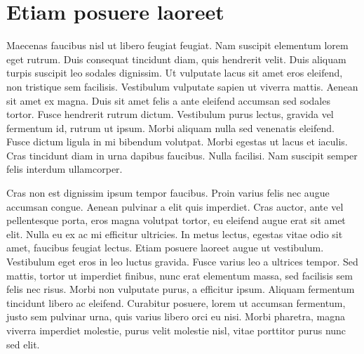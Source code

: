 \chapter{Etiam posuere laoreet}\label{app:two}
Maecenas faucibus nisl ut libero feugiat feugiat. Nam suscipit elementum lorem eget rutrum. Duis consequat tincidunt diam, quis hendrerit velit. Duis aliquam turpis suscipit leo sodales dignissim. Ut vulputate lacus sit amet eros eleifend, non tristique sem facilisis. Vestibulum vulputate sapien ut viverra mattis. Aenean sit amet ex magna. Duis sit amet felis a ante eleifend accumsan sed sodales tortor. Fusce hendrerit rutrum dictum. Vestibulum purus lectus, gravida vel fermentum id, rutrum ut ipsum. Morbi aliquam nulla sed venenatis eleifend. Fusce dictum ligula in mi bibendum volutpat. Morbi egestas ut lacus et iaculis. Cras tincidunt diam in urna dapibus faucibus. Nulla facilisi. Nam suscipit semper felis interdum ullamcorper.\par

Cras non est dignissim ipsum tempor faucibus. Proin varius felis nec augue accumsan congue. Aenean pulvinar a elit quis imperdiet. Cras auctor, ante vel pellentesque porta, eros magna volutpat tortor, eu eleifend augue erat sit amet elit. Nulla eu ex ac mi efficitur ultricies. In metus lectus, egestas vitae odio sit amet, faucibus feugiat lectus. Etiam posuere laoreet augue ut vestibulum. Vestibulum eget eros in leo luctus gravida. Fusce varius leo a ultrices tempor. Sed mattis, tortor ut imperdiet finibus, nunc erat elementum massa, sed facilisis sem felis nec risus. Morbi non vulputate purus, a efficitur ipsum. Aliquam fermentum tincidunt libero ac eleifend. Curabitur posuere, lorem ut accumsan fermentum, justo sem pulvinar urna, quis varius libero orci eu nisi. Morbi pharetra, magna viverra imperdiet molestie, purus velit molestie nisl, vitae porttitor purus nunc sed elit. 